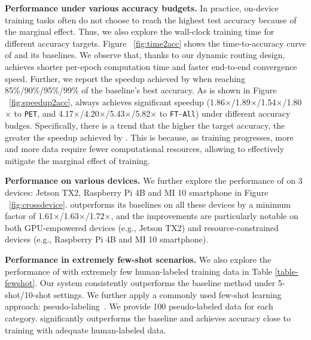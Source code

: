 


\noindent \textbf{Performance under various accuracy budgets. }
In practice, on-device training tasks often do not choose to reach the highest test accuracy because of the marginal effect.
Thus, we also explore the wall-clock training time for different accuracy targets.
Figure ~\ref{fig:time2acc} shows the time-to-accuracy curve of \sys and its baselines.
We observe that, thanks to our dynamic routing design, \sys achieves shorter per-epoch computation time and faster end-to-end convergence speed.
Further, we report the speedup achieved by \sys when reaching 85\%/90\%/95\%/99\% of the baseline's best accuracy.
As is shown in Figure ~\ref{fig:speedup2acc}, \sys always achieves significant speedup (1.86$\times$/1.89$\times$/1.54$\times$/1.80$\times$ to \texttt{PET}, and 4.17$\times$/4.20$\times$/5.43$\times$/5.82$\times$ to \texttt{FT-All}) under different accuracy budges.
Specifically, there is a trend that the higher the target accuracy, the greater the speedup achieved by \sys.
This is because, as training progresses, more and more data require fewer computational resources, allowing \sys to effectively mitigate the marginal effect of training.

\noindent \textbf{Performance on various devices.}
We further explore the performance of \sys on 3 devices: Jetson TX2, Raspberry Pi 4B and MI 10 smartphone in Figure ~\ref{fig:crossdevice}.
\sys outperforms its baselines on all these devices by a minimum factor of 1.61$\times$/1.63$\times$/1.72$\times$, and the improvements are particularly notable on both GPU-empowered devices (e.g., Jetson TX2) and resource-constrained devices (e.g., Raspberry Pi 4B and MI 10 smartphone).

\noindent \textbf{Performance in extremely few-shot scenarios.}
We also explore the performance of \sys with extremely few human-labeled training data in Table \ref{table-fewshot}. 
Our system consistently outperforms the baseline method under 5-shot/10-shot settings.
We further apply a commonly used few-shot learning approach: pseudo-labeling~\cite{lee2013pseudo}. 
We provide 100 pseudo-labeled data for each category. 
\sys significantly outperforms the baseline and achieves accuracy close to training with adequate human-labeled data.


